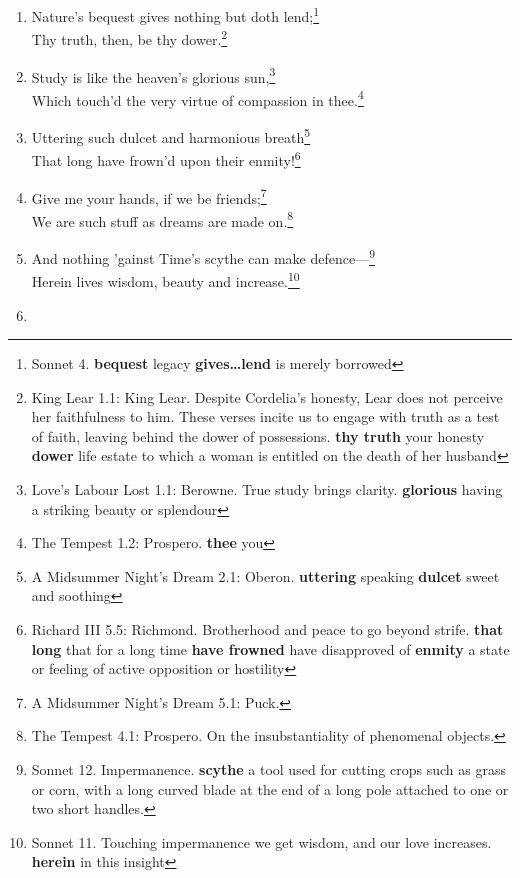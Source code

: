 \documentclass[17pt,twoside]{extarticle}
\begin{document}
\begin{enumerate}
{    \textbf{array} elaborate or beautiful clothing}\\And joy comes well
  in such a needy time.\footnote{Romeo and Juliet 3.5: Juliet.
    \textbf{comes well} is welcome \textbf{needy} insecure}
\item
  Nature's bequest gives nothing but doth lend;\footnote{Sonnet 4.
    \textbf{bequest} legacy \textbf{gives\ldots{}lend} is merely
    borrowed}\\Thy truth, then, be thy dower.\footnote{King Lear 1.1:
    King Lear. Despite Cordelia's honesty, Lear does not perceive her
    faithfulness to him. These verses incite us to engage with truth as
    a test of faith, leaving behind the dower of possessions.
    \textbf{thy truth} your honesty \textbf{dower} life estate to which
    a woman is entitled on the death of her husband}
\item
  Study is like the heaven's glorious sun,\footnote{Love's Labour Lost
    1.1: Berowne. True study brings clarity. \textbf{glorious} having a
    striking beauty or splendour}\\Which touch'd the very virtue of
  compassion in thee.\footnote{The Tempest 1.2: Prospero. \textbf{thee}
    you}
\item
  Uttering such dulcet and harmonious breath\footnote{A Midsummer
    Night's Dream 2.1: Oberon. \textbf{uttering} speaking
    \textbf{dulcet} sweet and soothing}\\That long have frown'd upon
  their enmity!\footnote{Richard III 5.5: Richmond. Brotherhood and
    peace to go beyond strife. \textbf{that long} that for a long time
    \textbf{have frowned} have disapproved of \textbf{enmity} a state or
    feeling of active opposition or hostility}
\item
  Give me your hands, if we be friends;\footnote{A Midsummer Night's
    Dream 5.1: Puck.}\\We are such stuff as dreams are made
  on.\footnote{The Tempest 4.1: Prospero. On the insubstantiality of
    phenomenal objects.}
\item
  And nothing 'gainst Time's scythe can make defence---\footnote{Sonnet
    12. Impermanence. \textbf{scythe} a tool used for cutting crops such
    as grass or corn, with a long curved blade at the end of a long pole
    attached to one or two short handles.}\\Herein lives wisdom, beauty
  and increase.\footnote{Sonnet 11. Touching impermanence we get wisdom,
    and our love increases. \textbf{herein} in this insight}
\item

\end{enumerate}
\end{document}
